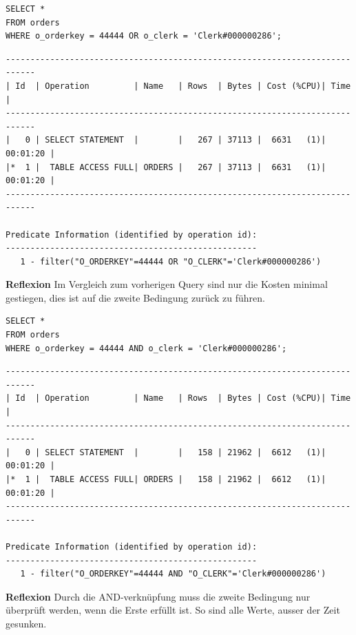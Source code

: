 \documentclass[10pt]{article}
\begin{document}
\begin{lstlisting}[style=sql]
SELECT *
FROM orders
WHERE o_orderkey = 44444 OR o_clerk = 'Clerk#000000286';
\end{lstlisting}
\begin{lstlisting}[style=queryexecutionplan]
----------------------------------------------------------------------------
| Id  | Operation         | Name   | Rows  | Bytes | Cost (%CPU)| Time     |
----------------------------------------------------------------------------
|   0 | SELECT STATEMENT  |        |   267 | 37113 |  6631   (1)| 00:01:20 |
|*  1 |  TABLE ACCESS FULL| ORDERS |   267 | 37113 |  6631   (1)| 00:01:20 |
----------------------------------------------------------------------------

Predicate Information (identified by operation id):
---------------------------------------------------
   1 - filter("O_ORDERKEY"=44444 OR "O_CLERK"='Clerk#000000286')
\end{lstlisting}
\textbf{Reflexion} \newline
Im Vergleich zum vorherigen Query sind nur die Kosten minimal gestiegen, dies 
ist auf die zweite Bedingung zurück zu führen.

\begin{lstlisting}[style=sql]
SELECT *
FROM orders
WHERE o_orderkey = 44444 AND o_clerk = 'Clerk#000000286';
\end{lstlisting}
\begin{lstlisting}[style=queryexecutionplan]
----------------------------------------------------------------------------
| Id  | Operation         | Name   | Rows  | Bytes | Cost (%CPU)| Time     |
----------------------------------------------------------------------------
|   0 | SELECT STATEMENT  |        |   158 | 21962 |  6612   (1)| 00:01:20 |
|*  1 |  TABLE ACCESS FULL| ORDERS |   158 | 21962 |  6612   (1)| 00:01:20 |
----------------------------------------------------------------------------

Predicate Information (identified by operation id):
---------------------------------------------------
   1 - filter("O_ORDERKEY"=44444 AND "O_CLERK"='Clerk#000000286')
\end{lstlisting}
\textbf{Reflexion} \newline
Durch die AND-verknüpfung muss die zweite Bedingung nur überprüft werden, wenn 
die Erste erfüllt ist. So sind alle Werte, ausser der Zeit gesunken.
\end{document}
